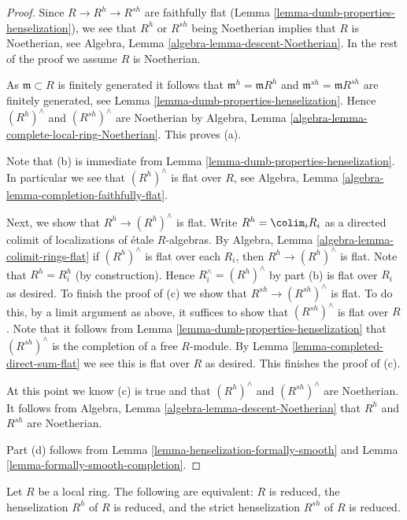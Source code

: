 \begin{proof}
Since $R \to R^h \to R^{sh}$ are faithfully flat
(Lemma \ref{lemma-dumb-properties-henselization}),
we see that $R^h$ or $R^{sh}$ being Noetherian implies that $R$
is Noetherian, see Algebra, Lemma \ref{algebra-lemma-descent-Noetherian}.
In the rest of the proof we assume $R$ is Noetherian.

\medskip\noindent
As $\mathfrak m \subset R$ is finitely generated it follows that
$\mathfrak m^h = \mathfrak m R^h$ and $\mathfrak m^{sh} = \mathfrak mR^{sh}$
are finitely generated, see Lemma \ref{lemma-dumb-properties-henselization}.
Hence $(R^h)^\wedge$ and $(R^{sh})^\wedge$ are Noetherian by
Algebra, Lemma \ref{algebra-lemma-complete-local-ring-Noetherian}.
This proves (a).

\medskip\noindent
Note that (b) is immediate from
Lemma \ref{lemma-dumb-properties-henselization}.
In particular we see that $(R^h)^\wedge$ is flat over $R$, see
Algebra, Lemma \ref{algebra-lemma-completion-faithfully-flat}.

\medskip\noindent
Next, we show that $R^h \to (R^h)^\wedge$ is flat.
Write $R^h = \colim_i R_i$ as a directed colimit of
localizations of \'etale $R$-algebras. By
Algebra, Lemma \ref{algebra-lemma-colimit-rings-flat}
if $(R^h)^\wedge$ is flat over each $R_i$, then $R^h \to (R^h)^\wedge$ is
flat. Note that $R^h = R_i^h$ (by construction).
Hence $R_i^\wedge = (R^h)^\wedge$
by part (b) is flat over $R_i$ as desired. To finish the proof of (c)
we show that $R^{sh} \to (R^{sh})^\wedge$ is flat. To do this, by a
limit argument as above, it suffices to show that $(R^{sh})^\wedge$
is flat over $R$. Note that it follows from
Lemma \ref{lemma-dumb-properties-henselization}
that $(R^{sh})^\wedge$ is the completion of a free $R$-module.
By Lemma \ref{lemma-completed-direct-sum-flat}
we see this is flat over $R$ as desired. This finishes the proof of (c).

\medskip\noindent
At this point we know (c) is true and that $(R^h)^\wedge$ and
$(R^{sh})^\wedge$ are Noetherian. It follows from
Algebra, Lemma \ref{algebra-lemma-descent-Noetherian}
that $R^h$ and $R^{sh}$ are Noetherian.

\medskip\noindent
Part (d) follows from Lemma \ref{lemma-henselization-formally-smooth}
and Lemma \ref{lemma-formally-smooth-completion}.
\end{proof}

\begin{lemma}
\label{lemma-henselization-reduced}
Let $R$ be a local ring.
The following are equivalent: $R$ is reduced,
the henselization $R^h$ of $R$ is reduced, and
the strict henselization $R^{sh}$ of $R$ is reduced.
\end{lemma}

